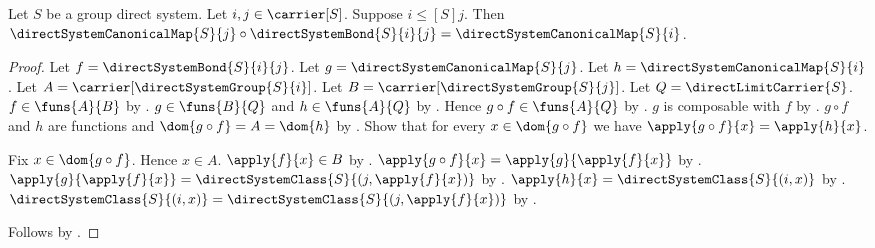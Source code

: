 \begin{theorem}\label{direct_system_canonical_map_compatibility}
    Let $S$ be a group direct system.
    Let $i,j\in\carrier[S]$.
    Suppose $i\mathrel{\leq[S]}j$.
    Then
        $\directSystemCanonicalMap{S}{j}\circ
            \directSystemBond{S}{i}{j}
        =\directSystemCanonicalMap{S}{i}$.
\end{theorem}
\begin{proof}
    Let $f=\directSystemBond{S}{i}{j}$.
    Let $g=\directSystemCanonicalMap{S}{j}$.
    Let $h=\directSystemCanonicalMap{S}{i}$.
    Let $A=\carrier[\directSystemGroup{S}{i}]$.
    Let $B=\carrier[\directSystemGroup{S}{j}]$.
    Let $Q=\directLimitCarrier{S}$.
    $f\in\funs{A}{B}$ by
        .
    $g\in\funs{B}{Q}$ and $h\in\funs{A}{Q}$ by
        .
    Hence $g\circ f\in\funs{A}{Q}$ by
        .
    $g$ is composable with $f$ by
        .
    $g\circ f$ and $h$ are functions and
        $\dom{g\circ f}=A=\dom{h}$ by
        .
    Show that for every $x\in\dom{g\circ f}$ we have
        $\apply{g\circ f}{x}=\apply{h}{x}$.
    \begin{subproof}
        Fix $x\in\dom{g\circ f}$.
        Hence $x\in A$.
        $\apply{f}{x}\in B$ by .
        $\apply{g\circ f}{x}=\apply{g}{\apply{f}{x}}$ by
            .
        $\apply{g}{\apply{f}{x}}=
            \directSystemClass{S}{(j,\apply{f}{x})}$ by
            .
        $\apply{h}{x}=\directSystemClass{S}{(i,x)}$ by
            .
        $\directSystemClass{S}{(i,x)}=
            \directSystemClass{S}{(j,\apply{f}{x})}$ by
            .
    \end{subproof}
    Follows by .
\end{proof}

